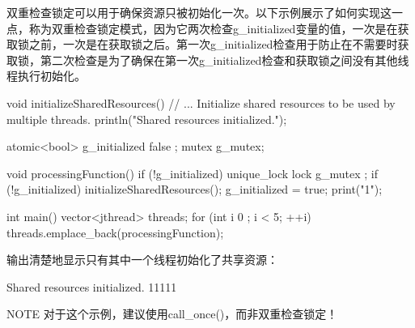 双重检查锁定可以用于确保资源只被初始化一次。以下示例展示了如何实现这一点，称为双重检查锁定模式，因为它两次检查g\_initialized变量的值，一次是在获取锁之前，一次是在获取锁之后。第一次g\_initialized检查用于防止在不需要时获取锁，第二次检查是为了确保在第一次g\_initialized检查和获取锁之间没有其他线程执行初始化。

\begin{cpp}
void initializeSharedResources()
{
    // ... Initialize shared resources to be used by multiple threads.
    println("Shared resources initialized.");
}

atomic<bool> g_initialized { false };
mutex g_mutex;

void processingFunction()
{
    if (!g_initialized) {
        unique_lock lock { g_mutex };
        if (!g_initialized) {
            initializeSharedResources();
            g_initialized = true;
        }
    }
    print("1");
}

int main()
{
    vector<jthread> threads;
    for (int i { 0 }; i < 5; ++i) {
        threads.emplace_back(processingFunction);
    }
}
\end{cpp}

输出清楚地显示只有其中一个线程初始化了共享资源：

\begin{shell}
Shared resources initialized.
11111
\end{shell}


\begin{myNotic}{NOTE}
对于这个示例，建议使用call\_once()，而非双重检查锁定！
\end{myNotic}





